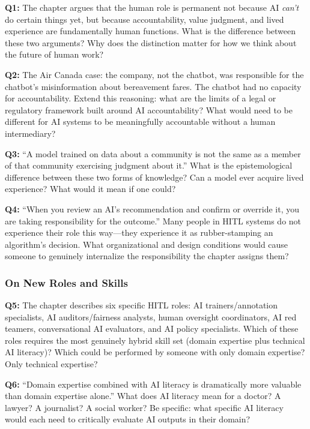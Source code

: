 \textbf{Q1:} The chapter argues that the human role is permanent not because AI \emph{can't} do certain things yet, but because accountability, value judgment, and lived experience are fundamentally human functions. What is the difference between these two arguments? Why does the distinction matter for how we think about the future of human work?

\textbf{Q2:} The Air Canada case: the company, not the chatbot, was responsible for the chatbot's misinformation about bereavement fares. The chatbot had no capacity for accountability. Extend this reasoning: what are the limits of a legal or regulatory framework built around AI accountability? What would need to be different for AI systems to be meaningfully accountable without a human intermediary?

\textbf{Q3:} ``A model trained on data about a community is not the same as a member of that community exercising judgment about it.'' What is the epistemological difference between these two forms of knowledge? Can a model ever acquire lived experience? What would it mean if one could?

\textbf{Q4:} ``When you review an AI's recommendation and confirm or override it, you are taking responsibility for the outcome.'' Many people in HITL systems do not experience their role this way---they experience it as rubber-stamping an algorithm's decision. What organizational and design conditions would cause someone to genuinely internalize the responsibility the chapter assigns them?

\subsubsection*{On New Roles and Skills}

\textbf{Q5:} The chapter describes six specific HITL roles: AI trainers/annotation specialists, AI auditors/fairness analysts, human oversight coordinators, AI red teamers, conversational AI evaluators, and AI policy specialists. Which of these roles requires the most genuinely hybrid skill set (domain expertise plus technical AI literacy)? Which could be performed by someone with only domain expertise? Only technical expertise?

\textbf{Q6:} ``Domain expertise combined with AI literacy is dramatically more valuable than domain expertise alone.'' What does AI literacy mean for a doctor? A lawyer? A journalist? A social worker? Be specific: what specific AI literacy would each need to critically evaluate AI outputs in their domain?

